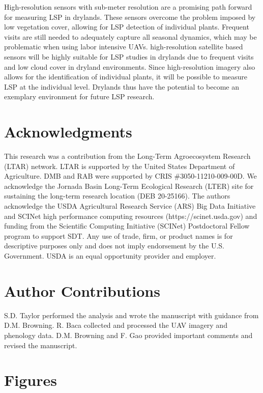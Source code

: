 \documentclass{article}
\begin{document}
High-resolution sensors with sub-meter resolution are a promising path forward for measuring LSP in drylands. These sensors overcome the problem imposed by low vegetation cover, allowing for LSP detection of individual plants. Frequent visits are still needed to adequately capture all seasonal dynamics, which may be problematic when using labor intensive UAVs. high-resolution satellite based sensors will be highly suitable for LSP studies in drylands due to frequent visits and low cloud cover in dryland environments. Since high-resolution imagery also allows for the identification of individual plants, it will be possible to measure LSP at the individual level. Drylands thus have the potential to become an exemplary environment for future LSP research. 

\section*{Acknowledgments}
This research was a contribution from the Long-Term Agroecosystem Research (LTAR) network. LTAR is supported by the United States Department of Agriculture. DMB and RAB were supported by CRIS \#3050-11210-009-00D. We acknowledge the Jornada Basin Long-Term Ecological Research (LTER) site for sustaining the long-term research location (DEB 20-25166). The authors acknowledge the USDA Agricultural Research Service (ARS) Big Data Initiative and SCINet high performance computing resources (https://scinet.usda.gov) and funding from the Scientific Computing Initiative (SCINet) Postdoctoral Fellow program to support SDT. Any use of trade, firm, or product names is for descriptive purposes only and does not imply endorsement by the U.S. Government. USDA is an equal opportunity provider and employer.


\section*{Author Contributions} 
S.D. Taylor performed the analysis and wrote the manuscript with guidance from D.M. Browning. R. Baca collected and processed the UAV imagery and phenology data. D.M. Browning and F. Gao provided important comments and revised the manuscript.


\printbibliography

\section*{Figures}
\end{document}
